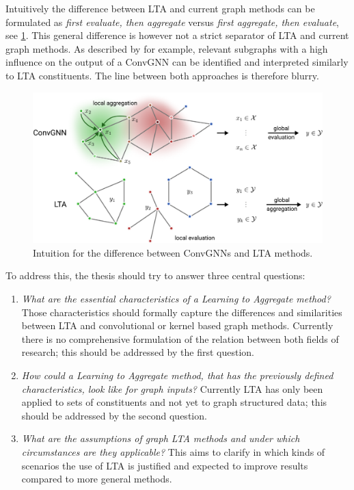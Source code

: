 \documentclass[12pt]{scrartcl}
\begin{document}
Intuitively the difference between LTA and current graph methods can be formulated as \textit{first evaluate, then aggregate} versus \textit{first aggregate, then evaluate}, see \cref{fig:gnnvslta}.
This general difference is however not a strict separator of LTA and current graph methods.
As described by \citet{Pope2018} for example, relevant subgraphs with a high influence on the output of a ConvGNN can be identified and interpreted similarly to LTA constituents.
The line between both approaches is therefore blurry.
\begin{figure}[h]
	\centering
	\includegraphics[width=0.9\linewidth]{GNNvsLTA.pdf}
	\caption{Intuition for the difference between ConvGNNs and LTA methods.}\label{fig:gnnvslta}
\end{figure}

To address this, the thesis should try to answer three central questions:
\begin{enumerate}
	\item \textit{What are the essential characteristics of a Learning to Aggregate method?}
		Those characteristics should formally capture the differences and similarities between LTA and convolutional or kernel based graph methods.
		Currently there is no comprehensive formulation of the relation between both fields of research;
		this should be addressed by the first question.
	\item \textit{How could a Learning to Aggregate method, that has the previously defined characteristics, look like for graph inputs?}
		Currently LTA has only been applied to sets of constituents and not yet to graph structured data;
		this should be addressed by the second question.
	\item \textit{What are the assumptions of graph LTA methods and under which circumstances are they applicable?}
		This aims to clarify in which kinds of scenarios the use of LTA is justified and expected to improve results compared to more general methods.
\end{enumerate}
\end{document}
